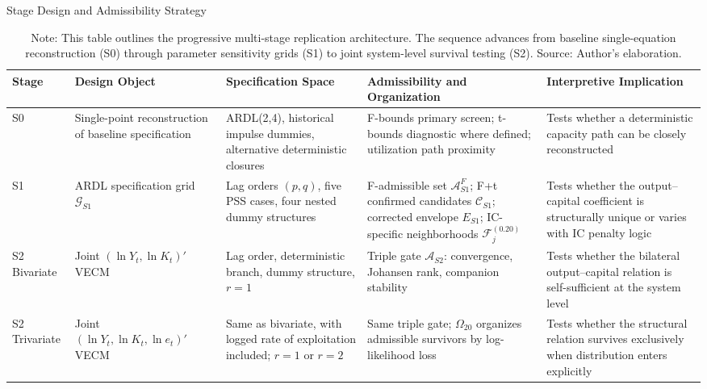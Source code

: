 \begin{table}[h!]
\centering
\scriptsize
\caption{Stage Design and Admissibility Strategy}
\label{tab:cross_stage_synthesis_design}
\begin{tabular}{@{}>{\raggedright\arraybackslash}p{1.6cm}>{\raggedright\arraybackslash}p{2.6cm}>{\raggedright\arraybackslash}p{3.0cm}>{\raggedright\arraybackslash}p{3.2cm}>{\raggedright\arraybackslash}p{3.2cm}@{}}
\toprule
Stage & Design Object & Specification Space & Admissibility and Organization & Interpretive Implication \\
\midrule
\midrule
S0 & Single-point reconstruction of baseline specification & ARDL(2,4), historical impulse dummies, alternative deterministic closures & F-bounds primary screen; t-bounds diagnostic where defined; utilization path proximity & Tests whether a deterministic capacity path can be closely reconstructed \\
S1 & ARDL specification grid $\mathcal{G}_{S1}$ & Lag orders $(p,q)$, five PSS cases, four nested dummy structures & F-admissible set $\mathcal{A}^{F}_{S1}$; F+t confirmed candidates $\mathcal{C}_{S1}$; corrected envelope $E_{S1}$; IC-specific neighborhoods $\mathcal{F}^{(0.20)}_j$ & Tests whether the output--capital coefficient is structurally unique or varies with IC penalty logic \\
S2 Bivariate & Joint $(\ln Y_t, \ln K_t)'$ VECM & Lag order, deterministic branch, dummy structure, $r=1$ & Triple gate $\mathcal{A}_{S2}$: convergence, Johansen rank, companion stability & Tests whether the bilateral output--capital relation is self-sufficient at the system level \\
S2 Trivariate & Joint $(\ln Y_t, \ln K_t, \ln e_t)'$ VECM & Same as bivariate, with logged rate of exploitation included; $r=1$ or $r=2$ & Same triple gate; $\Omega_{20}$ organizes admissible survivors by log-likelihood loss & Tests whether the structural relation survives exclusively when distribution enters explicitly \\
\bottomrule
\end{tabular}
\caption*{\footnotesize Note: This table outlines the progressive multi-stage replication architecture. The sequence advances from baseline single-equation reconstruction (S0) through parameter sensitivity grids (S1) to joint system-level survival testing (S2). Source: Author's elaboration.}
\end{table}

